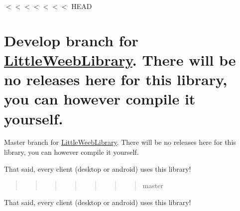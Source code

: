 $<$$<$$<$$<$$<$$<$$<$ H\+E\+AD \section*{Develop branch for \mbox{\hyperlink{namespace_little_weeb_library}{Little\+Weeb\+Library}}. There will be no releases here for this library, you can however compile it yourself. }

Master branch for \mbox{\hyperlink{namespace_little_weeb_library}{Little\+Weeb\+Library}}. There will be no releases here for this library, you can however compile it yourself.

That said, every client (desktop or android) uses this library! \begin{quote}
\begin{quote}
\begin{quote}
\begin{quote}
\begin{quote}
\begin{quote}
\begin{quote}
master \end{quote}
\end{quote}
\end{quote}
\end{quote}
\end{quote}
\end{quote}
\end{quote}


That said, every client (desktop or android) uses this library! 